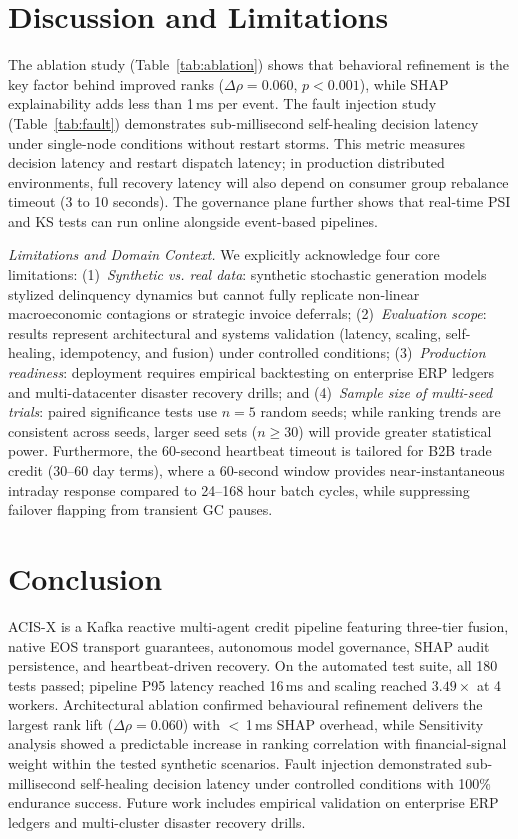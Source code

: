 \documentclass[conference]{IEEEtran}
\begin{document}
\section{Discussion and Limitations}
\label{sec:discussion}

The ablation study (Table~\ref{tab:ablation}) shows that behavioral refinement is the key factor behind improved ranks ($\Delta\rho=0.060$, $p<0.001$), while SHAP explainability adds less than 1\,ms per event. The fault injection study (Table~\ref{tab:fault}) demonstrates sub-millisecond self-healing decision latency under single-node conditions without restart storms. This metric measures decision latency and restart dispatch latency; in production distributed environments, full recovery latency will also depend on consumer group rebalance timeout (3 to 10 seconds). The governance plane further shows that real-time PSI and KS tests can run online alongside event-based pipelines.

\noindent\textit{Limitations and Domain Context.} We explicitly acknowledge four core limitations: (1)~\textit{Synthetic vs. real data}: synthetic stochastic generation models stylized delinquency dynamics but cannot fully replicate non-linear macroeconomic contagions or strategic invoice deferrals; (2)~\textit{Evaluation scope}: results represent architectural and systems validation (latency, scaling, self-healing, idempotency, and fusion) under controlled conditions; (3)~\textit{Production readiness}: deployment requires empirical backtesting on enterprise ERP ledgers and multi-datacenter disaster recovery drills; and (4)~\textit{Sample size of multi-seed trials}: paired significance tests use $n=5$ random seeds; while ranking trends are consistent across seeds, larger seed sets ($n \ge 30$) will provide greater statistical power. Furthermore, the 60-second heartbeat timeout is tailored for B2B trade credit (30--60 day terms), where a 60-second window provides near-instantaneous intraday response compared to 24--168 hour batch cycles, while suppressing failover flapping from transient GC pauses.

\section{Conclusion}
\label{sec:conclusion}

ACIS-X is a Kafka reactive multi-agent credit pipeline featuring three-tier fusion, native EOS transport guarantees, autonomous model governance, SHAP audit persistence, and heartbeat-driven recovery. On the automated test suite, all 180 tests passed; pipeline P95 latency reached 16\,ms and scaling reached $3.49\times$ at 4 workers. Architectural ablation confirmed behavioural refinement delivers the largest rank lift ($\Delta\rho=0.060$) with $<$\,1\,ms SHAP overhead, while Sensitivity analysis showed a predictable increase in ranking correlation with financial-signal weight within the tested synthetic scenarios. Fault injection demonstrated sub-millisecond self-healing decision latency under controlled conditions with 100\% endurance success. Future work includes empirical validation on enterprise ERP ledgers and multi-cluster disaster recovery drills.
\end{document}

